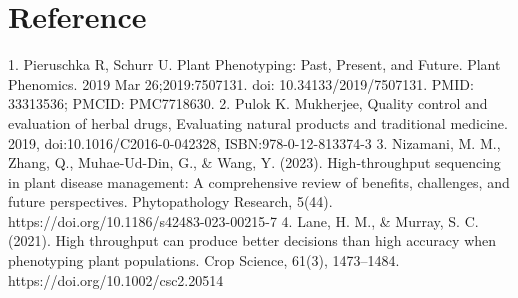 \documentclass[12pt,a4paper]{report}
\begin{document}
\chapter{Reference}
1. Pieruschka R, Schurr U. Plant Phenotyping: Past, Present, and Future. Plant Phenomics. 2019 Mar 26;2019:7507131. doi: 10.34133/2019/7507131. PMID: 33313536; PMCID: PMC7718630.
2. Pulok K. Mukherjee, Quality control and evaluation of herbal drugs, Evaluating natural products and traditional medicine. 2019, doi:10.1016/C2016-0-042328, ISBN:978-0-12-813374-3
3. Nizamani, M. M., Zhang, Q., Muhae-Ud-Din, G., & Wang, Y. (2023). High-throughput sequencing in plant disease management: A comprehensive review of benefits, challenges, and future perspectives. Phytopathology Research, 5(44). https://doi.org/10.1186/s42483-023-00215-7
4. Lane, H. M., & Murray, S. C. (2021). High throughput can produce better decisions than high accuracy when phenotyping plant populations. Crop Science, 61(3), 1473–1484. https://doi.org/10.1002/csc2.20514
\end{document}
